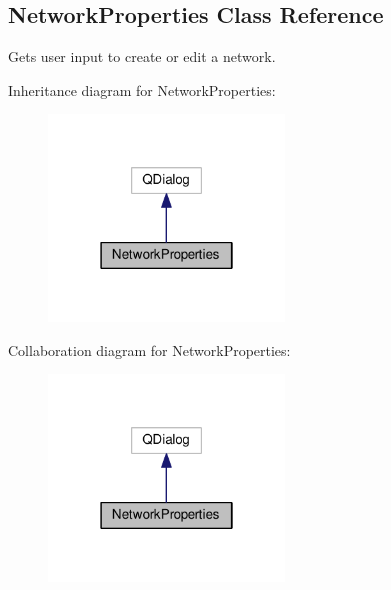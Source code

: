 \hypertarget{class_network_properties}{}\subsection{Network\+Properties Class Reference}
\label{class_network_properties}


Gets user input to create or edit a network.  




Inheritance diagram for Network\+Properties\+:
\nopagebreak
\begin{figure}[H]
\begin{center}
\leavevmode
\includegraphics[width=178pt]{class_network_properties__inherit__graph}
\end{center}
\end{figure}


Collaboration diagram for Network\+Properties\+:
\nopagebreak
\begin{figure}[H]
\begin{center}
\leavevmode
\includegraphics[width=178pt]{class_network_properties__coll__graph}
\end{center}
\end{figure}
